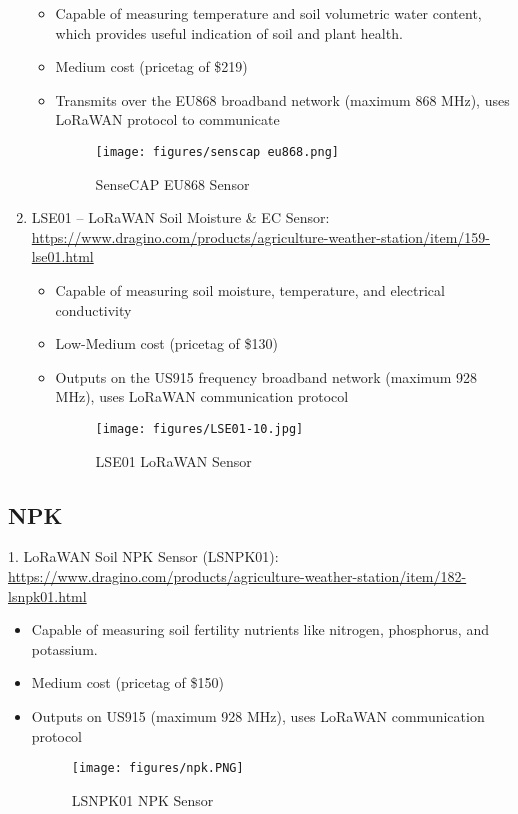 \documentclass{article}
\begin{document}
\begin{enumerate}
\begin{itemize}
\item Capable of measuring temperature and soil volumetric water content, which provides useful indication of soil and plant health.
\item Medium cost (pricetag of \$219)
\item Transmits over the EU868 broadband network (maximum 868 MHz), uses LoRaWAN protocol to communicate

\begin{figure}[htp]
    \centering
    \texttt{[image: figures/senscap eu868.png]}
    \caption{SenseCAP EU868 Sensor}
\end{figure}

\end{itemize}

\item LSE01 -- LoRaWAN Soil Moisture & EC Sensor: \url{https://www.dragino.com/products/agriculture-weather-station/item/159-lse01.html}
\begin{itemize}

\item Capable of measuring soil moisture, temperature, and electrical conductivity
\item Low-Medium cost (pricetag of \$130)	
\item Outputs on the US915 frequency broadband network (maximum 928 MHz), uses LoRaWAN communication protocol

\begin{figure}[htp]
    \centering
    \texttt{[image: figures/LSE01-10.jpg]}
    \caption{LSE01 LoRaWAN Sensor}
\end{figure}

\end{itemize}
\end{enumerate}


\subsection{NPK}
1. LoRaWAN Soil NPK Sensor (LSNPK01): \url{https://www.dragino.com/products/agriculture-weather-station/item/182-lsnpk01.html}
\begin{itemize}

\item Capable of measuring soil fertility nutrients like nitrogen, phosphorus, and potassium.
\item Medium cost (pricetag of \$150)
\item Outputs on US915 (maximum 928 MHz), uses LoRaWAN communication protocol

\begin{figure}[htp]
    \centering
    \texttt{[image: figures/npk.PNG]}
    \caption{LSNPK01 NPK Sensor}
\end{figure}

\end{itemize}
\end{document}
